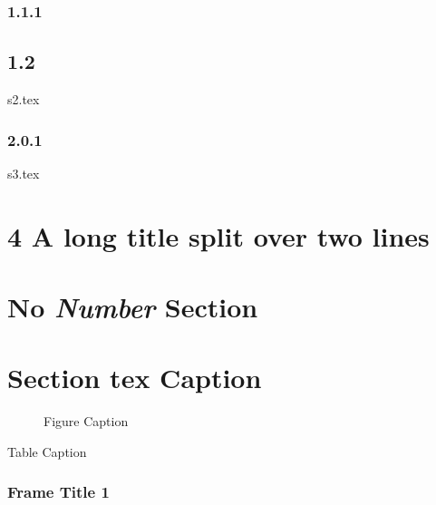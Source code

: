 \documentclass{article}
\begin{document}

\label{sec11}
\subsubsection{1.1.1}
\subsection{1.2}
{s2.tex}
\subsubsection{2.0.1}
{s3.tex}
\section{4 A long title split
over two lines}
\section*{No \textit{Number} Section}
\section{Section \texorpdfstring{tex}{pdf} Caption}
\begin{figure}
\end{figure}
\begin{figure}
\caption{Figure Caption}
\end{figure}
\begin{table}
\caption{Table Caption}
\end{table}
\begin{frame}
\frametitle{Frame Title 1}
\end{frame}
\begin{frame}
\end{frame}
\end{document}
